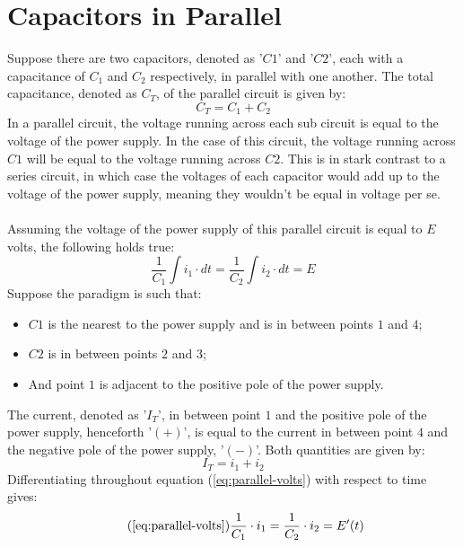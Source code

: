 \documentclass{article}
\begin{document}
	\section[Parallel]{Capacitors in Parallel}
	Suppose there are two capacitors, denoted as '$C1$' and '$C2$', each with a 
	capacitance of $C_1$ and $C_2$ respectively, in parallel with one another.  
	The total capacitance, denoted as $C_T$, of the parallel circuit is given 
	by:
	\begin{equation}\label{eq:parallel-capac}
		C_T = C_1 + C_2
	\end{equation}
	In a parallel circuit, the voltage running across each sub circuit is equal 
	to the voltage of the power supply.  In the case of this circuit, the 
	voltage running across $C1$ will be equal to the voltage running across 
	$C2$.  This is in stark contrast to a series circuit, in which case the 
	voltages of each capacitor would add up to the voltage of the power supply, 
	meaning they wouldn't be equal in voltage per se. \\ \\
	Assuming the voltage of the power supply of this parallel circuit is equal 
	to $E$ volts, the following holds true:
	\begin{equation}\label{eq:parallel-volts}
		\frac{1}{C_1}\int i_1 \cdot dt = \frac{1}{C_2} \int i_2 \cdot dt = E
	\end{equation}
	Suppose the paradigm is such that:
	\begin{itemize}
		\item $C1$ is the nearest to the power supply and is in between points 
		$1$ and $4$;
		\item $C2$ is in between points $2$ and $3$;
		\item And point $1$ is adjacent to the positive pole of the power 
		supply.
	\end{itemize}
	The current, denoted as '$I_T$', in between point $1$ and the positive pole 
	of the power supply, henceforth '$(+)$', is equal to the current in between 
	point $4$ and the negative pole of the power supply, '$(-)$'.  Both 
	quantities are given by:
	\begin{equation}\label{eq:parallel-cur}
		I_T = i_1 + i_2
	\end{equation}
	Differentiating throughout equation (\ref{eq:parallel-volts}) with respect 
	to time gives:
	\begin{equation}\tag{\ref{eq:parallel-volts}}
		\frac{1}{C_1} \cdot i_1 = \frac{1}{C_2} \cdot i_2 = E'(t)
	\end{equation}
\end{document}
